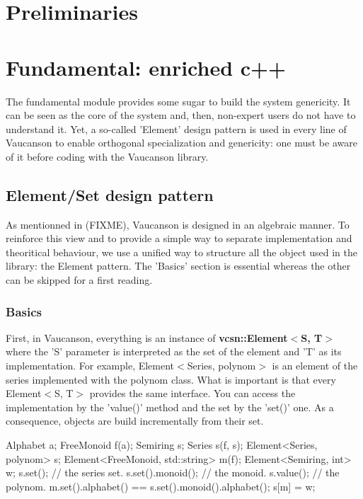 \documentclass{article}
\begin{document}
\section{Preliminaries}


\section{Fundamental: enriched c++}

The fundamental module provides some sugar to build the system
genericity. It can be seen as the core of the system and, then,
non-expert users do not have to understand it. Yet, a so-called
'Element' design pattern is used in every line of Vaucanson to enable
orthogonal specialization and genericity: one must be aware of it
before coding with the Vaucanson library.

\subsection{Element/Set design pattern}

As mentionned in (FIXME), Vaucanson is designed in an algebraic
manner. To reinforce this view and to provide a simple way to separate
implementation and theoritical behaviour, we use a unified way to
structure all the object used in the library: the Element pattern. The
'Basics' section is essential whereas the other can be skipped for a
first reading.

\subsubsection{Basics}

First, in Vaucanson, everything is an instance of
\textbf{vcsn::Element$<$S, T$>$} where the 'S' parameter is
interpreted as the set of the element and 'T' as its implementation.
For example, Element$<$Series, polynom$>$ is an element of the series
implemented with the polynom class. What is important is that every
Element$<$S, T$>$ provides the same interface. You can access the
implementation by the 'value()' method and the set by the 'set()' one.
As a consequence, objects are build incrementally from their set. 

\begin{code}
Alphabet a;
FreeMonoid f(a);
Semiring s;
Series s(f, s);
Element<Series, polynom> s;
Element<FreeMonoid, std::string> m(f);
Element<Semiring, int>   w;
s.set();          // the series set.
s.set().monoid(); // the monoid.
s.value();        // the polynom.
m.set().alphabet() == s.set().monoid().alphabet();
s[m] = w;
\end{code}
\end{document}
